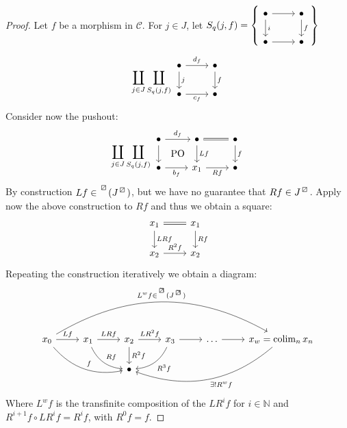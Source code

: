 \begin{proof}
    Let $f$ be a morphism in $\mathcal{C}$.
    For $j \in J$, let $S_q(j,f)=
    \left\{ 
        \begin{tikzcd}
        \bullet
        \ar[d, "i"]
        \ar[r]
        &
        \bullet
        \ar[d, "f"]
        \\
        \bullet 
        \ar[r]
        &
        \bullet
        \end{tikzcd}
    \right\}$
    \[
    \coprod_{j\in J}\coprod_{S_q(j,f)}
    \begin{tikzcd}
        \bullet
        \ar[d, "j"]
        \ar[r, "d_f"]
        &
        \bullet
        \ar[d, "f"]
        \\
        \bullet 
        \ar[r, "c_f"']
        &
        \bullet
    \end{tikzcd}
    \]
    Consider now the pushout:
    \[
    \coprod_{j\in J}\coprod_{S_q(j,f)}
    \begin{tikzcd}
        \bullet
        \ar[r, "d_f"]
        \ar[d]
        \ar[r, phantom, shift right =3.4ex, "\PO" ]
        &
        \bullet
        \ar[d, "Lf"]
        \ar[r, equal]
        &
        \bullet
        \ar[d, "f"]
        \\
        \bullet
        \ar[r,"b_f"']
        &
        x_1 
        \ar[r, "Rf"']
        &
        \bullet
    \end{tikzcd}
    \]
    By construction $Lf \in \prescript{\lift{}}{}{(J^{\lift{}})}$, but we have no guarantee that $Rf \in J^{\lift{}}$.
    Apply now the above construction to $Rf$ and thus we obtain a square:
    \[
    \begin{tikzcd}
        x_1 
        \ar[r, equal]
        \ar[d, "LRf"]
        &
        x_1
        \ar[d, "Rf"]
        \\
        x_2
        \ar[r, "R^2f"]
        &
        x_2
    \end{tikzcd}
    \]
    Repeating the construction iteratively we obtain a diagram:
    \[
    \begin{tikzcd}
        x_0
        \ar[r, "Lf"]
        \ar[rrd, bend right, "f"]
        \ar[rrrrr, bend left, "{L^wf \in \prescript{\lift{}}{}{(J^{\lift{}})}}" ]
        &
        x_1
        \ar[r,"LRf"]
        \ar[rd, bend right, "Rf"]
        &
        x_2
        \ar[r, "LR^2f"]
        \dar["R^2f"]
        &
        x_3
        \ar[r]
        \ar[ld, bend left,"R^3f"]
        &
        \dotsc 
        \rar
        &
        x_w=\colim_n x_n
        \ar[llld, bend left, "\exists ! R^wf"]
        \\
        &&
        \bullet
    \end{tikzcd}
    \]
    Where $L^wf$ is the transfinite composition of the $LR^if$ for $i \in \mathbb{N}$ and $R^{i+1}f \circ LR^if=R^if$, with $R^0f=f$.


\end{proof}
